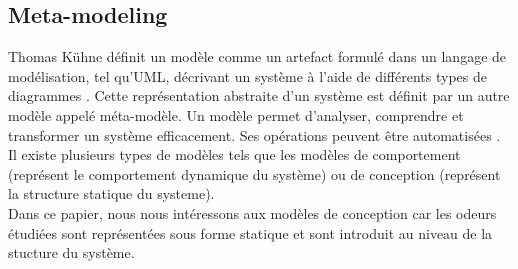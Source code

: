 


\subsection{Meta-modeling}

Thomas Kühne définit un  modèle comme un artefact formulé dans un langage de
modélisation, tel qu'UML, décrivant un système à l'aide de différents types de
diagrammes \cite{kuhne2006matters}. Cette représentation abstraite d'un système
est définit par un autre modèle appelé méta-modèle. Un modèle permet d'analyser,
comprendre et transformer un système efficacement.
Ses opérations peuvent être automatisées \cite{gonzalez2014formal}. Il existe
plusieurs types de modèles tels que les modèles de comportement (représent le
comportement dynamique du système) ou de conception (représent la structure
statique du systeme).\\ Dans ce papier, nous nous intéressons aux modèles de
conception car
les odeurs étudiées sont représentées sous forme statique et sont introduit au
niveau de la stucture du système.\\

